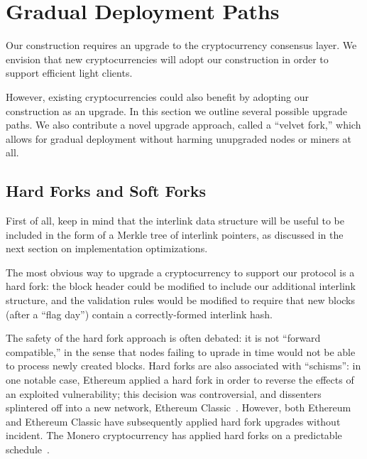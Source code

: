 \section{Gradual Deployment Paths}

\label{sec:forks}
Our construction requires an upgrade to the cryptocurrency consensus layer.
We envision that new cryptocurrencies will adopt our construction in order to support efficient light clients.

However, existing cryptocurrencies could also benefit by adopting our construction as an upgrade.
In this section we outline several possible upgrade paths. We also contribute a novel upgrade approach, called a ``velvet fork,'' which allows for gradual deployment without harming unupgraded nodes or miners at all.

\subsection{Hard Forks and Soft Forks}

First of all, keep in mind that the interlink data structure will be useful to
be included in the form of a Merkle tree of interlink pointers, as discussed in
the next section on implementation optimizations.

The most obvious way to upgrade a cryptocurrency to support our protocol is a hard fork: the block header could be modified to include our additional interlink structure, and the validation rules would be modified to require that new blocks (after a ``flag day'') contain a correctly-formed interlink hash.

The safety of the hard fork approach is often debated: it is not ``forward compatible,'' in the sense that nodes failing to uprade in time would not be able to process newly created blocks. Hard forks are also associated with ``schisms'': in one notable case, Ethereum applied a hard fork in order to reverse the effects of an exploited vulnerability; this decision was controversial, and dissenters splintered off into a new network, Ethereum Classic~\cite{daofork}. However, both Ethereum and Ethereum Classic have subsequently applied hard fork upgrades without incident. The Monero cryptocurrency has applied hard forks on a predictable schedule~\cite{monerohardforks}.

